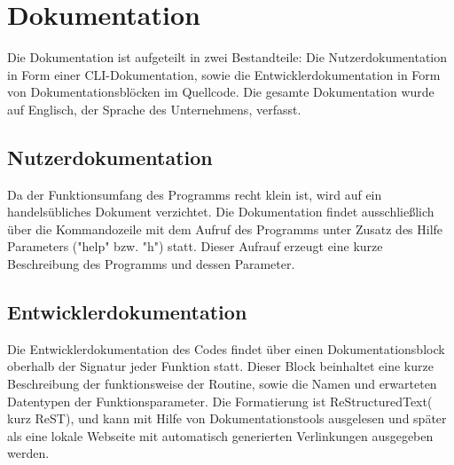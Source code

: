 \section{Dokumentation}
Die Dokumentation ist aufgeteilt in zwei Bestandteile: Die Nutzerdokumentation
in Form einer CLI-Dokumentation, sowie die Entwicklerdokumentation in Form von
Dokumentationsblöcken im Quellcode. Die gesamte Dokumentation wurde auf Englisch,
der Sprache des Unternehmens, verfasst.

\subsection{Nutzerdokumentation}
Da der Funktionsumfang des Programms recht klein ist, wird auf ein handelsübliches
Dokument verzichtet. Die Dokumentation findet ausschließlich über die Kommandozeile mit dem Aufruf des Programms unter Zusatz des Hilfe Parameters ("\-\-help" bzw. "\-h") statt.
Dieser Aufrauf erzeugt eine kurze Beschreibung des Programms und dessen Parameter.

\subsection{Entwicklerdokumentation}
Die Entwicklerdokumentation des Codes findet über einen
Dokumentationsblock oberhalb der Signatur jeder Funktion statt. Dieser Block beinhaltet eine kurze Beschreibung der funktionsweise der Routine, sowie die Namen und erwarteten Datentypen der Funktionsparameter. Die Formatierung ist ReStructuredText( kurz ReST), und kann mit Hilfe von Dokumentationstools ausgelesen und später als eine lokale Webseite mit automatisch generierten Verlinkungen ausgegeben werden.
